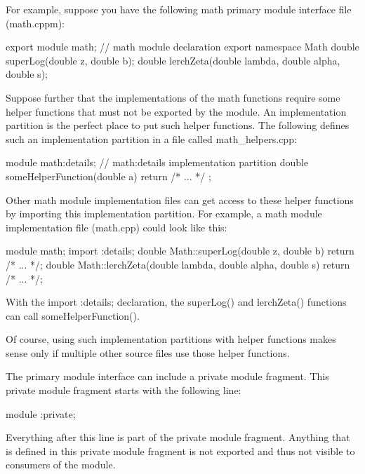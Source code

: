 For example, suppose you have the following math primary module interface file (math.cppm):

\begin{cpp}
export module math; // math module declaration
export namespace Math
{
    double superLog(double z, double b);
    double lerchZeta(double lambda, double alpha, double s);
}
\end{cpp}

Suppose further that the implementations of the math functions require some helper functions that must not be exported by the module. An implementation partition is the perfect place to put such helper functions. The following defines such an implementation partition in a file called math\_helpers.cpp:

\begin{cpp}
module math:details; // math:details implementation partition
double someHelperFunction(double a) { return /* ... */ ; }
\end{cpp}

Other math module implementation files can get access to these helper functions by importing this implementation partition. For example, a math module implementation file (math.cpp) could look like this:

\begin{cpp}
module math;
import :details;
double Math::superLog(double z, double b) { return /* ... */; }
double Math::lerchZeta(double lambda, double alpha, double s) { return /* ... */; }
\end{cpp}

With the import :details; declaration, the superLog() and lerchZeta() functions can call someHelperFunction().

Of course, using such implementation partitions with helper functions makes sense only if multiple other source files use those helper functions.


The primary module interface can include a private module fragment. This private module fragment starts with the following line:

\begin{cpp}
module :private;
\end{cpp}

Everything after this line is part of the private module fragment. Anything that is defined in this private module fragment is not exported and thus not visible to consumers of the module.

